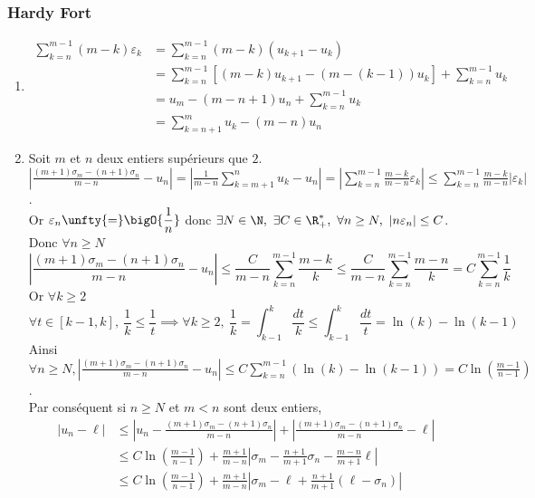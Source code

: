 \documentclass{book}
\begin{document}
	\subsubsection{Hardy Fort }
	\begin{enumerate}[leftmargin=*]
		\item
		\begin{align*}
			\displaystyle\sum_{k=n}^{m-1}(m-k)\varepsilon_k&=\sum_{k=n}^{m-1}(m-k)(u_{k+1}-u_k)\\
			&=\sum_{k=n}^{m-1}\left[(m-k)u_{k+1}-(m-(k-1))u_k\right]+\sum_{k=n}^{m-1}u_k\\
			&=u_m-(m-n+1)u_n+\sum_{k=n}^{m-1}u_k\\
			&=\sum_{k=n+1}^mu_k-(m-n)u_n
		\end{align*}
		\item Soit $m$ et $n$ deux entiers supérieurs que $2$.\\
		$\displaystyle\left|\frac{(m+1)\sigma_m-(n+1)\sigma_n}{m-n}-u_n\right|=\left|\frac{1}{m-n}\sum_{k=m+1}^nu_k-u_n\right|=\left|\sum_{k=n}^{m-1}\frac{m-k}{m-n}\varepsilon_k\right|\leq\sum_{k=n}^{m-1}\frac{m-k}{m-n}|\varepsilon_k|$.\\
		Or $\varepsilon_n\unfty{=}\bigO{\displaystyle\frac{1}{n}}$ donc $\exists N\in \N,\ \exists C\in \R^*_+,\ \forall n\geq N,\ |n\varepsilon_n|\leq C$.\\
		Donc $\forall n\geq N$ \[\displaystyle\left|\frac{(m+1)\sigma_m-(n+1)\sigma_n}{m-n}-u_n\right|\leq \frac{C}{m-n}\sum_{k=n}^{m-1}\frac{m-k}{k}\leq\frac{C}{m-n}\sum_{k=n}^{m-1}\frac{m-n}{k}=C\sum_{k=n}^{m-1}\frac{1}{k}\]
		Or $\forall k\geq 2$ \[\forall t\in [k-1,k],\ \displaystyle\frac{1}{k}\leq\frac{1}{t}\implies \forall k\geq 2,\ \frac{1}{k}=\int_{k-1}^k\frac{dt}{k}\leq \int_{k-1}^k\frac{dt}{t}=\ln(k)-\ln(k-1)\]
		Ainsi $\forall n\geq N, \displaystyle\left|\frac{(m+1)\sigma_m-(n+1)\sigma_n}{m-n}-u_n\right|\leq C\sum_{k=n}^{m-1}(\ln(k)-\ln(k-1))=C\ln\left(\frac{m-1}{n-1}\right)$.\\
		Par conséquent si $n\geq N$ et $m<n$ sont deux entiers,
		\begin{align*}
			|u_n-\ell|&\leq \left|u_n-\frac{(m+1)\sigma_m-(n+1)\sigma_n}{m-n}\right|+\left|\frac{(m+1)\sigma_m-(n+1)\sigma_n}{m-n}-\ell\right|\\
			&\leq C\ln\left(\frac{m-1}{n-1}\right)+\frac{m+1}{m-n}\left|\sigma_m-\frac{n+1}{m+1}\sigma_n-\frac{m-n}{m+1}\ell\right|\\
			&\leq C\ln\left(\frac{m-1}{n-1}\right)+\frac{m+1}{m-n}\left|\sigma_m-\ell+\frac{n+1}{m+1}(\ell-\sigma_n)\right|\\

\end{align*}
\end{enumerate}
\end{document}
